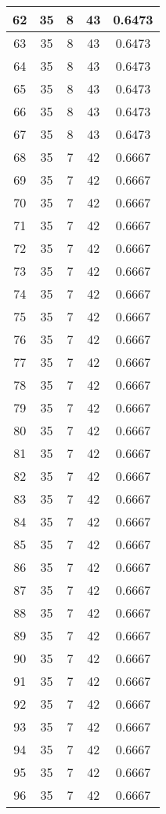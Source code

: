 \documentclass[letterpaper, 12pt]{article}
\begin{document}
\begin{longtable}{|c|c|c|c|c|}
\hline
62 & 35 & 8 & 43 & 0.6473 \\
\hline
63 & 35 & 8 & 43 & 0.6473 \\
\hline
64 & 35 & 8 & 43 & 0.6473 \\
\hline
65 & 35 & 8 & 43 & 0.6473 \\
\hline
66 & 35 & 8 & 43 & 0.6473 \\
\hline
67 & 35 & 8 & 43 & 0.6473 \\
\hline
68 & 35 & 7 & 42 & 0.6667 \\
\hline
69 & 35 & 7 & 42 & 0.6667 \\
\hline
70 & 35 & 7 & 42 & 0.6667 \\
\hline
71 & 35 & 7 & 42 & 0.6667 \\
\hline
72 & 35 & 7 & 42 & 0.6667 \\
\hline
73 & 35 & 7 & 42 & 0.6667 \\
\hline
74 & 35 & 7 & 42 & 0.6667 \\
\hline
75 & 35 & 7 & 42 & 0.6667 \\
\hline
76 & 35 & 7 & 42 & 0.6667 \\
\hline
77 & 35 & 7 & 42 & 0.6667 \\
\hline
78 & 35 & 7 & 42 & 0.6667 \\
\hline
79 & 35 & 7 & 42 & 0.6667 \\
\hline
80 & 35 & 7 & 42 & 0.6667 \\
\hline
81 & 35 & 7 & 42 & 0.6667 \\
\hline
82 & 35 & 7 & 42 & 0.6667 \\
\hline
83 & 35 & 7 & 42 & 0.6667 \\
\hline
84 & 35 & 7 & 42 & 0.6667 \\
\hline
85 & 35 & 7 & 42 & 0.6667 \\
\hline
86 & 35 & 7 & 42 & 0.6667 \\
\hline
87 & 35 & 7 & 42 & 0.6667 \\
\hline
88 & 35 & 7 & 42 & 0.6667 \\
\hline
89 & 35 & 7 & 42 & 0.6667 \\
\hline
90 & 35 & 7 & 42 & 0.6667 \\
\hline
91 & 35 & 7 & 42 & 0.6667 \\
\hline
92 & 35 & 7 & 42 & 0.6667 \\
\hline
93 & 35 & 7 & 42 & 0.6667 \\
\hline
94 & 35 & 7 & 42 & 0.6667 \\
\hline
95 & 35 & 7 & 42 & 0.6667 \\
\hline
96 & 35 & 7 & 42 & 0.6667 \\

\end{longtable}
\end{document}
